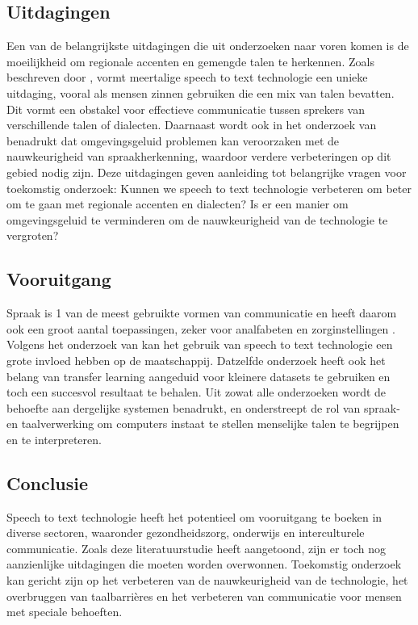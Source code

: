 \subsection{Uitdagingen}
\par Een van de belangrijkste uitdagingen die uit onderzoeken naar voren komen is de moeilijkheid om regionale accenten en gemengde talen te herkennen. Zoals beschreven door \autocite{Reddy2022}, vormt meertalige speech to text technologie een unieke uitdaging, vooral als mensen zinnen gebruiken die een mix van talen bevatten. Dit vormt een obstakel voor effectieve communicatie tussen sprekers van verschillende talen of dialecten. Daarnaast wordt ook in het onderzoek van \autocite{ajami2016use} benadrukt dat omgevingsgeluid problemen kan veroorzaken met de nauwkeurigheid van spraakherkenning, waardoor verdere verbeteringen op dit gebied nodig zijn.
Deze uitdagingen geven aanleiding tot belangrijke vragen voor toekomstig onderzoek: Kunnen we speech to text technologie verbeteren om beter om te gaan met regionale accenten en dialecten? Is er een manier om omgevingsgeluid te verminderen om de nauwkeurigheid van de technologie te vergroten?


\subsection{Vooruitgang}
\par Spraak is 1 van de meest gebruikte vormen van communicatie en heeft daarom ook een groot aantal toepassingen, zeker voor analfabeten en zorginstellingen \autocite{Arun2021}. Volgens het onderzoek van \autocite{Roepke2019} kan het gebruik van speech to text technologie een grote invloed hebben op de maatschappij. Datzelfde onderzoek heeft ook het belang van transfer learning aangeduid voor kleinere datasets te gebruiken en toch een succesvol resultaat te behalen. Uit zowat alle onderzoeken wordt de behoefte aan dergelijke systemen benadrukt, en onderstreept de rol van spraak- en taalverwerking om computers instaat te stellen menselijke talen te begrijpen en te interpreteren.

\subsection{Conclusie}
\par Speech to text technologie heeft het potentieel om vooruitgang te boeken in diverse sectoren, waaronder gezondheidszorg, onderwijs en interculturele communicatie. Zoals deze literatuurstudie heeft aangetoond, zijn er toch nog aanzienlijke uitdagingen die moeten worden overwonnen. Toekomstig onderzoek kan gericht zijn op het verbeteren van de nauwkeurigheid van de technologie, het overbruggen van taalbarrières en het verbeteren van communicatie voor mensen met speciale behoeften.

